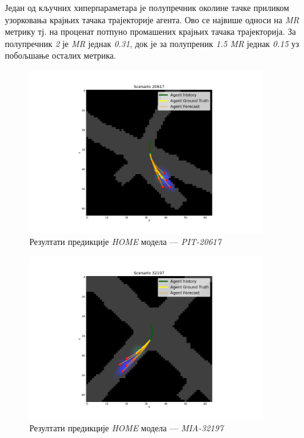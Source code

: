 \documentclass[11pt,oneside]{memoir}
\begin{document}
Један од кључних хиперпараметара је полупречник околине тачке приликом узорковања крајњих тачака трајекторије агента. Ово се највише
односи на \textit{MR} метрику тј. на проценат потпуно промашених крајњих тачака трајекторија. За полупречник \textit{2} је \textit{MR} једнак \textit{0.31}, док
је за полупреник \textit{1.5} \textit{MR} једнак \textit{0.15} уз побољшање осталих метрика.

\begin{figure}[H]
  \centering
  \includegraphics[width=0.9\textwidth]{images/home_PIT_20617.png}
  \caption{Резултати предикције \textit{HOME} модела --- \textit{PIT-20617} \label{home-PIT-20617}}
\end{figure}

\begin{figure}[H]
  \centering
  \includegraphics[width=0.9\textwidth]{images/home_MIA_32197.png}
  \caption{Резултати предикције \textit{HOME} модела --- \textit{MIA-32197} \label{home-MIA-32197}}
\end{figure}
\end{document}
